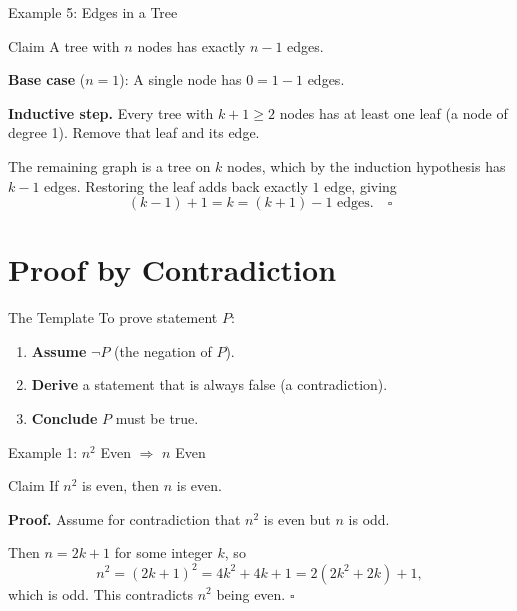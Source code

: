\documentclass[10pt,aspectratio=169]{beamer}
\begin{document}
\begin{frame}{Example 5: Edges in a Tree}
  \begin{block}{Claim}
    A tree with $n$ nodes has exactly $n - 1$ edges.
  \end{block}

  \pause
  \bigskip
  \textbf{Base case} ($n = 1$): A single node has $0 = 1 - 1$ edges.

  \pause
  \bigskip
  \textbf{Inductive step.}
  Every tree with $k + 1 \ge 2$ nodes has at least one \alert{leaf}
  (a node of degree 1). Remove that leaf and its edge.

  \bigskip
  The remaining graph is a tree on $k$ nodes, which by the induction
  hypothesis has $k - 1$ edges.
  Restoring the leaf adds back exactly $1$ edge, giving
  \[
    (k - 1) + 1 = k = (k+1) - 1 \text{ edges.} \quad \square
  \]
\end{frame}

\section{Proof by Contradiction}

\begin{frame}{The Template}
  To prove statement $P$:

  \bigskip
  \begin{enumerate}
    \item \textbf{Assume} $\neg P$ (the negation of $P$).
    \bigskip
    \item \textbf{Derive} a statement that is \alert{always false}
          (a contradiction).
    \bigskip
    \item \textbf{Conclude} $P$ must be true.
  \end{enumerate}
\end{frame}

\begin{frame}{Example 1: $n^2$ Even $\Rightarrow$ $n$ Even}
  \begin{block}{Claim}
    If $n^2$ is even, then $n$ is even.
  \end{block}

  \pause
  \bigskip
  \textbf{Proof.}  Assume for contradiction that $n^2$ is even but $n$ is \alert{odd}.

  \pause
  \bigskip
  Then $n = 2k + 1$ for some integer $k$, so
  \[
    n^2 = (2k+1)^2 = 4k^2 + 4k + 1 = 2(2k^2 + 2k) + 1,
  \]
  which is \alert{odd}.  This contradicts $n^2$ being even. $\square$
\end{frame}
\end{document}
